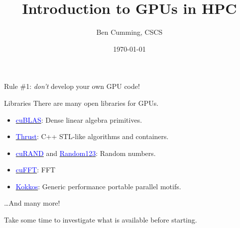 \documentclass[aspectratio=43]{beamer}
\author{Ben Cumming, CSCS}
\title{Introduction to GPUs in HPC}
\subtitle{}
\date{\today}
\begin{document}
\cscstitle


\begin{frame}[fragile]{}
    \centering
    Rule \#1: \emph{don't} develop your own GPU code!
\end{frame}

\begin{frame}[fragile]{Libraries}
    There are many open libraries for GPUs.
    \begin{itemize}
        \item \href{https://developer.nvidia.com/cublas}{\textcolor{blue}{cuBLAS}}: Dense linear algebra primitives.
        \item \href{https://developer.nvidia.com/thrust}{\textcolor{blue}{Thrust}}: C++ STL-like algorithms and containers.
        \item \href{https://developer.nvidia.com/thrust}{\textcolor{blue}{cuRAND}} and \href{http://www.thesalmons.org/john/random123/releases/latest/docs/}{\textcolor{blue}{Random123}}: Random numbers.
        \item \href{https://developer.nvidia.com/cufft}{\textcolor{blue}{cuFFT}}: FFT
        \item \href{https://github.com/kokkos/kokkos}{\textcolor{blue}{Kokkos}}: Generic performance portable parallel motifs.
    \end{itemize}
    \dots And many more!

    \vspace{1cm}

    Take some time to investigate what is available before starting.
\end{frame}
\end{document}
